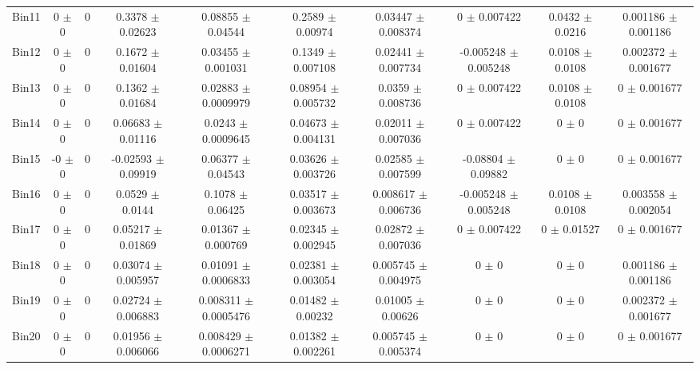 \begin{tabular}{@{\extracolsep{4pt}}lccccccccc@{}}
     Bin11 & 0 $\pm$ 0 & 0 & 0.3378 $\pm$ 0.02623 & 0.08855 $\pm$ 0.04544 & 0.2589 $\pm$ 0.00974 & 0.03447 $\pm$ 0.008374 & 0 $\pm$ 0.007422 & 0.0432 $\pm$ 0.0216 & 0.001186 $\pm$ 0.001186 \\ 
     Bin12 & 0 $\pm$ 0 & 0 & 0.1672 $\pm$ 0.01604 & 0.03455 $\pm$ 0.001031 & 0.1349 $\pm$ 0.007108 & 0.02441 $\pm$ 0.007734 & -0.005248 $\pm$ 0.005248 & 0.0108 $\pm$ 0.0108 & 0.002372 $\pm$ 0.001677 \\ 
     Bin13 & 0 $\pm$ 0 & 0 & 0.1362 $\pm$ 0.01684 & 0.02883 $\pm$ 0.0009979 & 0.08954 $\pm$ 0.005732 & 0.0359 $\pm$ 0.008736 & 0 $\pm$ 0.007422 & 0.0108 $\pm$ 0.0108 & 0 $\pm$ 0.001677 \\ 
     Bin14 & 0 $\pm$ 0 & 0 & 0.06683 $\pm$ 0.01116 & 0.0243 $\pm$ 0.0009645 & 0.04673 $\pm$ 0.004131 & 0.02011 $\pm$ 0.007036 & 0 $\pm$ 0.007422 & 0 $\pm$ 0 & 0 $\pm$ 0.001677 \\ 
     Bin15 & -0 $\pm$ 0 & 0 & -0.02593 $\pm$ 0.09919 & 0.06377 $\pm$ 0.04543 & 0.03626 $\pm$ 0.003726 & 0.02585 $\pm$ 0.007599 & -0.08804 $\pm$ 0.09882 & 0 $\pm$ 0 & 0 $\pm$ 0.001677 \\ 
     Bin16 & 0 $\pm$ 0 & 0 & 0.0529 $\pm$ 0.0144 & 0.1078 $\pm$ 0.06425 & 0.03517 $\pm$ 0.003673 & 0.008617 $\pm$ 0.006736 & -0.005248 $\pm$ 0.005248 & 0.0108 $\pm$ 0.0108 & 0.003558 $\pm$ 0.002054 \\ 
     Bin17 & 0 $\pm$ 0 & 0 & 0.05217 $\pm$ 0.01869 & 0.01367 $\pm$ 0.000769 & 0.02345 $\pm$ 0.002945 & 0.02872 $\pm$ 0.007036 & 0 $\pm$ 0.007422 & 0 $\pm$ 0.01527 & 0 $\pm$ 0.001677 \\ 
     Bin18 & 0 $\pm$ 0 & 0 & 0.03074 $\pm$ 0.005957 & 0.01091 $\pm$ 0.0006833 & 0.02381 $\pm$ 0.003054 & 0.005745 $\pm$ 0.004975 & 0 $\pm$ 0 & 0 $\pm$ 0 & 0.001186 $\pm$ 0.001186 \\ 
     Bin19 & 0 $\pm$ 0 & 0 & 0.02724 $\pm$ 0.006883 & 0.008311 $\pm$ 0.0005476 & 0.01482 $\pm$ 0.00232 & 0.01005 $\pm$ 0.00626 & 0 $\pm$ 0 & 0 $\pm$ 0 & 0.002372 $\pm$ 0.001677 \\ 
     Bin20 & 0 $\pm$ 0 & 0 & 0.01956 $\pm$ 0.006066 & 0.008429 $\pm$ 0.0006271 & 0.01382 $\pm$ 0.002261 & 0.005745 $\pm$ 0.005374 & 0 $\pm$ 0 & 0 $\pm$ 0 & 0 $\pm$ 0.001677 \\ 
\hline\hline
  \end{tabular}
